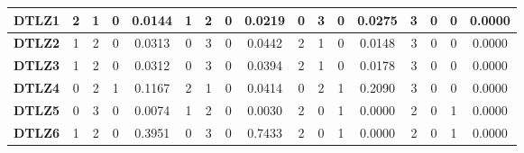 \begin{table*}[t]
{\begin{tabular}{c|c|c|c|c|c|c|c|c|c|c|c|c|c|c|c|c|}
\multicolumn{1}{|c|}{\textbf{DTLZ1}} & 2                   & 1                     & 0                          & 0.0144          & 1                   & 2                     & 0                          & 0.0219          & 0                   & 3                     & 0                          & 0.0275          & 3                   & 0                     & 0                          & 0.0000          \\ \hline
\multicolumn{1}{|c|}{\textbf{DTLZ2}} & 1                   & 2                     & 0                          & 0.0313          & 0                   & 3                     & 0                          & 0.0442          & 2                   & 1                     & 0                          & 0.0148          & 3                   & 0                     & 0                          & 0.0000          \\ \hline
\multicolumn{1}{|c|}{\textbf{DTLZ3}} & 1                   & 2                     & 0                          & 0.0312          & 0                   & 3                     & 0                          & 0.0394          & 2                   & 1                     & 0                          & 0.0178          & 3                   & 0                     & 0                          & 0.0000          \\ \hline
\multicolumn{1}{|c|}{\textbf{DTLZ4}} & 0                   & 2                     & 1                          & 0.1167          & 2                   & 1                     & 0                          & 0.0414          & 0                   & 2                     & 1                          & 0.2090          & 3                   & 0                     & 0                          & 0.0000          \\ \hline
\multicolumn{1}{|c|}{\textbf{DTLZ5}} & 0                   & 3                     & 0                          & 0.0074          & 1                   & 2                     & 0                          & 0.0030          & 2                   & 0                     & 1                          & 0.0000          & 2                   & 0                     & 1                          & 0.0000          \\ \hline
\multicolumn{1}{|c|}{\textbf{DTLZ6}} & 1                   & 2                     & 0                          & 0.3951          & 0                   & 3                     & 0                          & 0.7433          & 2                   & 0                     & 1                          & 0.0000          & 2                   & 0                     & 1                          & 0.0000          \\ \hline

\end{tabular}}
\end{table*}
